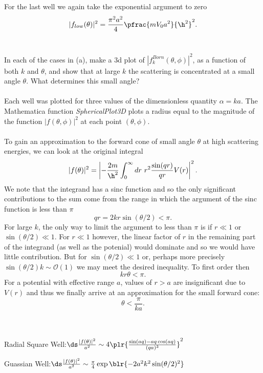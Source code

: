 \documentclass[10pt,letterpaper]{article}
\begin{document}
	\item
	For the last well we again take the exponential argument to zero
	\[
		|f_{low}(\theta)|^2 = \frac{\pi^2 a^2}{4}\pfrac{mV_0a^2}{\h^2}^2.
	\]
	\\
	\eenum
	\item 
	In each of the cases in (a), make a 3d plot of $|f_k^{Born}(\theta,\phi)|^2$, as a function of both
	$k$ and $\theta$, and show that at large $k$ the scattering is concentrated at a small angle $\theta$. 
	What determines this small angle?
	\\
	\\
	Each well was plotted for three values of the dimensionless quantity $\alpha = ka$. The Mathematica
	function \emph{SphericalPlot3D} plots a radius equal to the magnitude of the function $|f(\theta,\phi)|^2$
	at each point $(\theta,\phi)$. 
	\\
	\\
	To gain an approximation to the forward cone of small angle $\theta$ at high scattering energies, we can look at
	the original integral
	\[
		|f(\theta)|^2 = \left|-\frac{2m}{\h^2}\int_0^\infty dr\ r^2\frac{\sin(qr)}{qr}V(r)\right|^2.
	\]
	We note that the integrand has a sinc function and so the only significant contributions to the sum come from
	the range in which the argument of the sinc function is less than $\pi$
	\[
		qr = 2kr\sin(\theta/2) < \pi.
	\]
	For large $k$, the only way to limit the argument to less than $\pi$ is if $r\ll1$ or $\sin(\theta/2)\ll 1$. For 
	$r\ll 1$ however, the linear factor of $r$ in the remaining part of the integrand (as well as the potenial) would 		
	dominate and so
	we would have little contribution. But for $\sin(\theta/2)\ll1$ or, perhaps more precisely $\sin(\theta/2)k \sim
	 \mathcal O(1)$ we may meet the desired inequality. To first order then
	 \[
	 	kr\theta < \pi.
	\]
	For a potential with effective range $a$, values of $r>a$ are insignificant due to $V(r)$ and thus we
	finally arrive at an approximation for the small forward cone:
	\[
		\theta < \frac{\pi}{ka}.
	\]
	\\
	\\
	\benum
	\item{Radial Square Well:\qquad $\ds\frac{|f(\theta)|^2}{a^2} \sim 4\plr{\frac{\sin(aq)-aq\cos(aq)}{(qa)^3}}^2$}
	\\
	\phantom{}\phantom{}\phantom{}\phantom{}\phantom{}\phantom{}
	\item{Guassian Well:\qquad $\ds\frac{|f(\theta)|^2}{a^2} \sim 
	\frac{\pi}{4}\exp\blr{-2a^2k^2\sin(\theta/2)^2}$}
	\\
	\\
	
\end{document}
